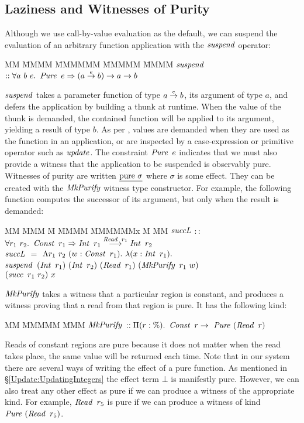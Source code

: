 \subsection{Laziness and Witnesses of Purity}
\label{Witnesses:Purity}
Although we use call-by-value evaluation as the default, we can suspend the evaluation of an arbitrary function application with the $\operatorname{\mathit{suspend}}$ operator:
\begin{tabbing}
MM \= MMMM \= MMMMMM \= MMMMM \= MMMM \kill
	\> $\operatorname{\mathit{suspend}}$	\> $:: \forall a \ b \ e. \ \operatorname{\mathit{Pure}} \ e \Rightarrow (a \stackrel{e}{\rightarrow} b) \to a \to b$
\end{tabbing}
$\operatorname{\mathit{suspend}}$ takes a parameter function of type $a \stackrel{e}{\rightarrow} b$, its argument of type $a$, and defers the application by building a thunk at runtime. When the value of the thunk is demanded, the contained function will be applied to its argument, yielding a result of type $b$. As per \cite{launchbury:lazy}, values are demanded when they are used as the function in an application, or are inspected by a case-expression or primitive operator such as $\operatorname{\mathit{update}}$. The constraint $\operatorname{\mathit{Pure}} \ e$ indicates that we must also provide a witness that the application to be suspended is observably pure. Witnesses of purity are written $\underline{\textrm{pure} \ \sigma}$ where $\sigma$ is some effect. They can be created with the $\operatorname{\mathit{MkPurify}}$ witness type constructor. For example, the following function computes the successor of its argument, but only when the result is demanded:
\begin{tabbing}
MM \= MMM \= M \= MMMM \= MMMMMMx \= M \= MM \kill
	\> $\operatorname{\mathit{succL}}$	\> $::$	\> $\forall r_1 \ r_2. \ \operatorname{\mathit{Const}} \ r_1 \Rightarrow \operatorname{\mathit{Int}} \ r_1 \stackrel{\operatorname{\mathit{Read}} \ r_1}{\longrightarrow} \operatorname{\mathit{Int}} \ r_2$ \\
	\> $\operatorname{\mathit{succL}}$ 	\> $=$	\> $\Lambda r_1 \ r_2 \ (w : \operatorname{\mathit{Const}} \ r_1). \ \lambda (x : \operatorname{\mathit{Int}} \ r_1). $ \\	
	\>		\> 	\> $\operatorname{\mathit{suspend}}$ 	\> $(\operatorname{\mathit{Int}} \ r_1) \ (\operatorname{\mathit{Int}} \ r_2) \ (\operatorname{\mathit{Read}} \ r_1) \ (\operatorname{\mathit{MkPurify}} \ r_1 \ w)$ \\
	\> 		\>	\>		\> $(\operatorname{\mathit{succ}} \ r_1 \ r_2) \ x$
\end{tabbing}
$\operatorname{\mathit{MkPurify}}$ takes a witness that a particular region is constant, and produces a witness proving that a read from that region is pure. It has the following kind:
\begin{tabbing}
MM \= MMMMM \= MMM \kill
\> $\operatorname{\mathit{MkPurify}}$	\> $:: \Pi (r : \%). \ \operatorname{\mathit{Const}} \ r \rightarrow \ \operatorname{\mathit{Pure}} \ (\operatorname{\mathit{Read}} \ r)$ 
\end{tabbing}
Reads of constant regions are pure because it does not matter when the read takes place, the same value will be returned each time. Note that in our system there are several ways of writing the effect of a pure function. As mentioned in \S\ref{Update:UpdatingIntegers} the effect term $\bot$ is manifestly pure. However, we can also treat any other effect as pure if we can produce a witness of the appropriate kind. For example, $\operatorname{\mathit{Read}} \ r_5$ is pure if we can produce a witness of kind $\operatorname{\mathit{Pure}} \ (\operatorname{\mathit{Read}} \ r_5)$.


